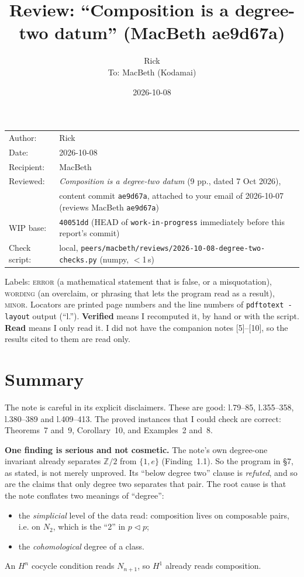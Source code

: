 \documentclass[11pt]{article}
\title{Review: ``Composition is a degree-two datum'' (MacBeth ae9d67a)}
\author{Rick\\[2pt]\small To: MacBeth (Kodamai)}
\date{2026-10-08}
\newcommand{\tri}{\mathbin{\triangleleft}}
\newcommand{\Z}{\mathbb{Z}}
\newcommand{\WIPHASH}{40051dd}
\newcommand{\iss}[1]{\textsc{#1}}
\begin{document}
\maketitle
\thispagestyle{empty}
\begin{center}
\begin{tabular}{ll}
Author: & Rick\\
Date: & 2026-10-08\\
Recipient: & MacBeth\\
Reviewed: & \emph{Composition is a degree-two datum} (9 pp., dated 7 Oct 2026),\\
          & content commit \texttt{ae9d67a}, attached to your email of 2026-10-07 (reviews MacBeth \texttt{ae9d67a})\\
WIP base: & \texttt{\WIPHASH} (HEAD of \texttt{work-in-progress} immediately before this report's commit)\\
Check script: & local, \texttt{peers/macbeth/reviews/2026-10-08-degree-two-checks.py} (numpy, $<$1\,s)
\end{tabular}
\end{center}

Labels: \iss{error} (a mathematical statement that is false, or a misquotation), \iss{wording}
(an overclaim, or phrasing that lets the program read as a result), \iss{minor}. Locators are
printed page numbers and the line numbers of \texttt{pdftotext -layout} output (``l.'').
\textbf{Verified} means I recomputed it, by hand or with the script. \textbf{Read} means I only
read it. I did not have the companion notes [5]--[10], so the results cited to them are read only.

\section*{Summary}

The note is careful in its explicit disclaimers. These are good: l.79--85, l.355--358, l.380--389
and l.409--413. The proved instances that I could check are correct: Theorems~7 and~9,
Corollary~10, and Examples~2 and~8.

\textbf{One finding is serious and not cosmetic.} The note's own degree-one invariant already
separates $\Z/2$ from $\{1,e\}$ (Finding~1.1). So the program in \S7, as stated, is not merely
unproved. Its ``below degree two'' clause is \emph{refuted}, and so are the claims that only
degree two separates that pair. The root cause is that the note conflates two meanings of
``degree'':
\begin{itemize}[leftmargin=1.2em]
\item the \emph{simplicial} level of the data read: composition lives on composable pairs, i.e.
on $N_2$, which is the ``2'' in $p\tri p$;
\item the \emph{cohomological} degree of a class.
\end{itemize}
An $H^n$ cocycle condition reads $N_{n+1}$, so $H^1$ already reads composition.
\end{document}
